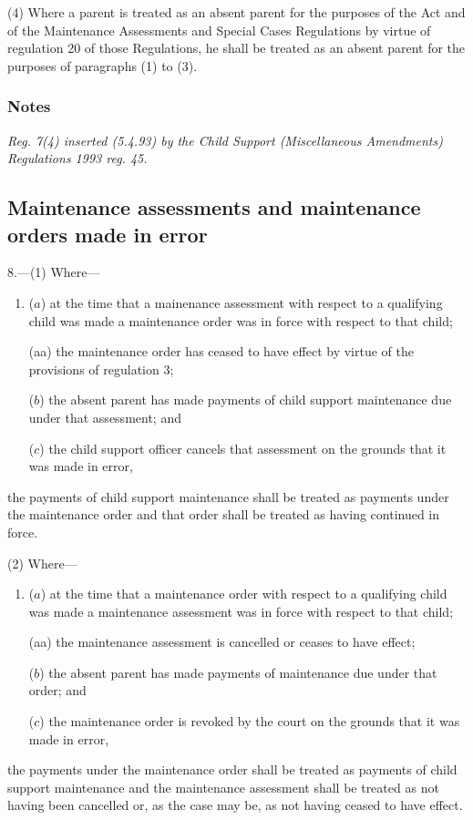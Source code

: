 \documentclass[a4paper]{article}
\newcommand\amendment[1]{\subsubsection*{Notes}{\itshape\frenchspacing\footnotesize #1 \par}}
\begin{document}
(4) Where a parent is treated as an absent parent for the purposes of the Act and of the Maintenance Assessments and Special Cases Regulations by virtue of regulation 20 of those Regulations, he shall be treated as an absent parent for the purposes of paragraphs (1) to (3).

\amendment{
Reg. 7(4) inserted (5.4.93) by the Child Support (Miscellaneous Amendments) Regulations 1993 reg. 45.
}

\subsection[8. Maintenance assessments and maintenance orders made in error]{Maintenance assessments and maintenance orders made in error}

8.—(1) Where—
\begin{enumerate}\item[]
($a$) at the time that a mainenance assessment with respect to a qualifying child was made a maintenance order was in force with respect to that child;

(aa) the maintenance order has ceased to have effect by virtue of the provisions of regulation 3;

($b$) the absent parent has made payments of child support maintenance due under that assessment; and

($c$) the child support officer cancels that assessment on the grounds that it was made in error,
\end{enumerate}
the payments of child support maintenance shall be treated as payments under the maintenance order and that order shall be treated as having continued in force.

(2) Where—
\begin{enumerate}\item[]
($a$) at the time that a maintenance order with respect to a qualifying child was made a maintenance assessment was in force with respect to that child;

(aa) the maintenance assessment is cancelled or ceases to have effect;

($b$) the absent parent has made payments of maintenance due under that order; and

($c$) the maintenance order is revoked by the court on the grounds that it was made in error,
\end{enumerate}
the payments under the maintenance order shall be treated as payments of child support maintenance and the maintenance assessment shall be treated as not having been cancelled
or, as the case may be, as not having ceased to have effect. %
\end{document}
